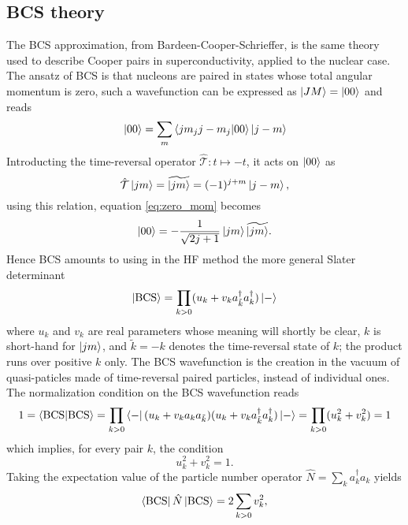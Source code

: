\subsection{BCS theory}
The BCS approximation, from Bardeen-Cooper-Schrieffer, is the same theory used to describe Cooper pairs in superconductivity, applied to the nuclear case.
The ansatz of BCS is that nucleons are paired in states whose total angular momentum is zero, such a wavefunction can be expressed as $\ket{JM}=\ket{00}$ and reads
\begin{equation}
    \label{eq:zero_mom}
    \ket{00} = \sum_m \bra{jm_j j-m_j}\ket{00}\ket{j-m}
\end{equation}
Introducting the time-reversal operator $\hat {\mathcal T}:t\mapsto -t$, it acts on $\ket{00}$ as 
\begin{equation}
    \hat {\mathcal T} \ket{jm} = \widetilde{\ket{{jm}}} = (-1)^{j+m}\ket{j-m},
\end{equation}
using this relation, equation \eqref{eq:zero_mom} becomes 
\begin{equation}
    \ket{00} =- \frac{1}{\sqrt{2j+1}}\ket{jm}\widetilde{\ket{{jm}}}.
\end{equation}
Hence BCS amounts to using in the HF method the more general Slater determinant
\begin{equation}
    \label{eq:bcs_det}
    \ket{\text{BCS}} = \prod_{k>0}(u_k+ v_k a_{\tilde k}^\dagger a_k^\dagger) \ket{-}
\end{equation}
where $u_k$ and $v_k$ are real parameters whose meaning will shortly be clear, $k$ is short-hand for $\ket{jm}$, and $\tilde k = -k$ denotes the time-reversal state of $k$; the product runs over positive $k$ only. The BCS wavefunction is the creation in the vacuum of quasi-paticles made of time-reversal paired particles, instead of individual ones. The normalization condition on the BCS wavefunction reads
\begin{equation}
    \label{eq:bcs_norm}
    1=\braket{\text{BCS}} = \prod_{k>0} \bra{-}(u_{k}+v_{k}a_{k}a_{\tilde k})(u_k+v_k a_{\tilde k}^\dagger a_k^\dagger)\ket{-} =\prod_{k>0}(u_k^2+v_k^2)=1
\end{equation}
which implies, for every pair $k$, the condition
\begin{equation}
    \label{eq:norm_uv}
    u_k^2+v_k^2=1.
\end{equation}
Taking the expectation value of the particle number operator $\hat N = \sum_k a_k ^\dagger a_k$ yields \cite{bertulani2007nuclear}
\begin{equation}
    \bra{\text{BCS}} \hat N \ket{\text{BCS}} = 2\sum_ {k>0} v_k^2,
\end{equation}
